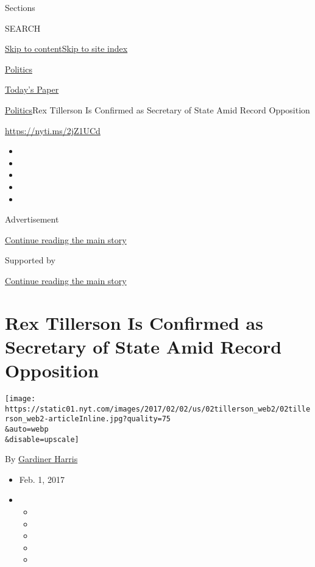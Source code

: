 Sections

SEARCH

\protect\hyperlink{site-content}{Skip to
content}\protect\hyperlink{site-index}{Skip to site index}

\href{https://www.nytimes.com/section/politics}{Politics}

\href{https://myaccount.nytimes.com/auth/login?response_type=cookie\&client_id=vi}{}

\href{https://www.nytimes.com/section/todayspaper}{Today's Paper}

\href{/section/politics}{Politics}\textbar{}Rex Tillerson Is Confirmed
as Secretary of State Amid Record Opposition

\url{https://nyti.ms/2jZ1UCd}

\begin{itemize}
\item
\item
\item
\item
\item
\end{itemize}

Advertisement

\protect\hyperlink{after-top}{Continue reading the main story}

Supported by

\protect\hyperlink{after-sponsor}{Continue reading the main story}

\hypertarget{rex-tillerson-is-confirmed-as-secretary-of-state-amid-record-opposition}{%
\section{Rex Tillerson Is Confirmed as Secretary of State Amid Record
Opposition}\label{rex-tillerson-is-confirmed-as-secretary-of-state-amid-record-opposition}}

\texttt{[image: https://static01.nyt.com/images/2017/02/02/us/02tillerson\_web2/02tillerson\_web2-articleInline.jpg?quality=75\\\&auto=webp\\\&disable=upscale]}

By \href{http://www.nytimes.com/by/gardiner-harris}{Gardiner Harris}

\begin{itemize}
\item
  Feb. 1, 2017
\item
  \begin{itemize}
  \item
  \item
  \item
  \item
  \item
  \end{itemize}
\end{itemize}

